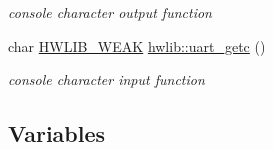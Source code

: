 \begin{DoxyCompactItemize}
\begin{DoxyCompactList}\small\item\em console character output function \end{DoxyCompactList}\item 
char \hyperlink{hwlib-defines_8hpp_a04be4340016df60d6636c1d1c6d94fc9}{H\+W\+L\+I\+B\+\_\+\+W\+E\+AK} \hyperlink{namespacehwlib_a0f433c14b5302d476ed723a38862d9d3}{hwlib\+::uart\+\_\+getc} ()
\begin{DoxyCompactList}\small\item\em console character input function \end{DoxyCompactList}\end{DoxyCompactItemize}
\subsection*{Variables}
